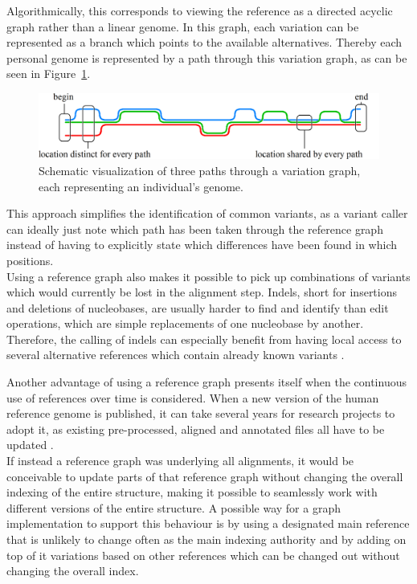 \documentclass[a4paper,12pt,twoside,BCOR=10mm]{scrbook}
\begin{document}
Algorithmically, this corresponds to viewing the reference as a directed acyclic graph rather than a linear genome.
In this graph, each variation can be represented as a branch which points to the available alternatives.
Thereby each personal genome is represented by a path through this variation graph,
as can be seen in Figure~\ref{fig:evo_intro_three_ref_seq_align}. \\
\begin{figure}[!htb]
\centering
\includegraphics[width=\textwidth]{evo_intro_three_ref_seq_align.png}
\caption[Schematic visualization of three paths through a variation graph]{Schematic visualization of three paths through a variation graph, each representing an individual's genome.} \label{fig:evo_intro_three_ref_seq_align}
\end{figure}
This approach simplifies the identification of common variants, as a variant caller can
ideally just note which path has been taken through the reference graph instead of having to
explicitly state which differences have been found in which positions. \\
Using a reference graph also makes it possible to pick up combinations of variants
which would currently be lost in the alignment step.
Indels, short for insertions and deletions of nucleobases,
are usually harder to find and identify than edit operations,
which are simple replacements of one nucleobase by another.
Therefore, the calling of indels can especially
benefit from having local access to several alternative references which contain
already known variants \citep{Albers2010}.

Another advantage of using a reference graph presents itself when the continuous use of
references over time is considered.
When a new version of the human reference genome is published,
it can take several years for research projects to adopt it,
as existing pre-processed, aligned and annotated files all have to be updated \citep{RedditSwitchTo38}. \\
If instead a reference graph was underlying all alignments, it would be conceivable
to update parts of that reference graph without changing the overall indexing of the entire structure,
making it possible to seamlessly work with different versions of the entire structure.
A possible way for a graph implementation to support this behaviour is by using a designated main
reference that is unlikely to change often as the main indexing authority and by adding on top of it
variations based on other references which can be changed out without changing the overall index.
\end{document}
